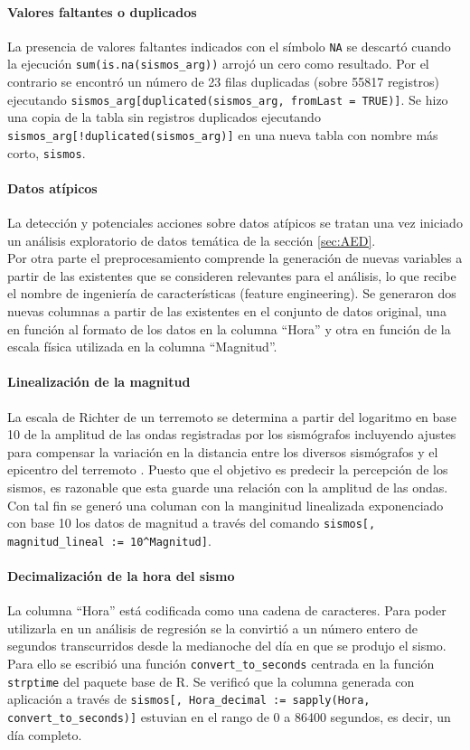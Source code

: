 \documentclass[a4paper]{report}
\begin{document}
\paragraph{Valores faltantes o duplicados}
La presencia de valores faltantes indicados con el símbolo \verb'NA' se descartó cuando la ejecución \verb'sum(is.na(sismos_arg))' arrojó un cero como resultado.
Por el contrario se encontró un número de 23 filas duplicadas (sobre 55817 registros) ejecutando \verb'sismos_arg[duplicated(sismos_arg, fromLast = TRUE)]'.
Se hizo una copia de la tabla sin registros duplicados ejecutando \verb'sismos_arg[!duplicated(sismos_arg)]' en una nueva tabla con nombre más corto, \verb'sismos'.


\paragraph{Datos atípicos}
La detección y potenciales acciones sobre datos atípicos se tratan una vez iniciado un análisis exploratorio de datos temática de la sección \ref{sec:AED}.\\


Por otra parte el preprocesamiento comprende la generación de nuevas variables a partir de las existentes que se consideren relevantes para el análisis, lo que recibe el nombre de ingeniería de características (feature engineering).
Se generaron dos nuevas columnas a partir de las existentes en el conjunto de datos original, una en función al formato de los datos en la columna ``Hora'' y otra en función de la escala física utilizada en la columna ``Magnitud''.


\paragraph{Linealización de la magnitud}
La escala de Richter de un terremoto se determina a partir del logaritmo en base 10 de la amplitud de las ondas registradas por los sismógrafos incluyendo ajustes para compensar la variación en la distancia entre los diversos sismógrafos y el epicentro del terremoto \cite{willian_l_ellsworth_earthquake_1991}.
Puesto que el objetivo es predecir la percepción de los sismos, es razonable que esta guarde una relación con la amplitud de las ondas.
Con tal fin se generó una columan con la manginitud linealizada exponenciado con base 10 los datos de magnitud a través del comando \verb'sismos[, magnitud_lineal := 10^Magnitud]'.


\paragraph{Decimalización de la hora del sismo}
La columna ``Hora'' está codificada como una cadena de caracteres.
Para poder utilizarla en un análisis de regresión se la convirtió a un número entero de segundos transcurridos desde la medianoche del día en que se produjo el sismo. 
Para ello se escribió una función \verb'convert_to_seconds' centrada en la función \verb'strptime' del paquete base de R.
Se verificó que la columna generada con aplicación a través de \verb'sismos[, Hora_decimal := sapply(Hora, convert_to_seconds)]' estuvian en el rango de 0 a 86400 segundos, es decir, un día completo.
\end{document}
